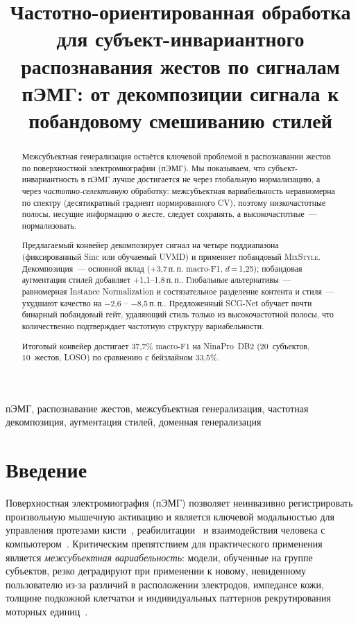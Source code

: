 \documentclass[conference]{IEEEtran}
\title{Частотно-ориентированная обработка для субъект-инвариантного распознавания жестов по сигналам пЭМГ: от декомпозиции сигнала к побандовому смешиванию стилей}
\author{
\IEEEauthorblockN{К.\,С.~Голован, И.\,А.~Зверева}
\IEEEauthorblockA{%
Департамент информационных технологий\\
Национальный исследовательский университет <<Высшая школа экономики>>\\
Москва, Россия\\
\texttt{kgolovan@edu.hse.ru}}
}
\newcommand{\pp}{\,п.\,п.}
\newcommand{\mixstyle}{\textsc{MixStyle}}
\newcommand{\uvmd}{\textsc{UVMD}}
\begin{document}
\maketitle

\begin{abstract}
Межсубъектная генерализация остаётся ключевой проблемой в распознавании жестов по поверхностной электромиографии (пЭМГ).
Мы показываем, что субъект-инвариантность в пЭМГ лучше достигается не через глобальную нормализацию, а через \emph{частотно-селективную} обработку: межсубъектная вариабельность неравномерна по спектру (десятикратный градиент нормированного CV), поэтому низкочастотные полосы, несущие информацию о жесте, следует сохранять, а высокочастотные~--- нормализовать.

Предлагаемый конвейер декомпозирует сигнал на четыре поддиапазона (фиксированный Sinc или обучаемый \uvmd{}) и применяет побандовый \mixstyle{}.
Декомпозиция~--- основной вклад (+3,7\pp{} macro-F1, $d$\,=\,1,25); побандовая аугментация стилей добавляет +1,1--1,8\pp{}.
Глобальные альтернативы~--- равномерная Instance Normalization и состязательное разделение контента и стиля~--- ухудшают качество на $-$2,6 -- $-$8,5\pp{}.
Предложенный SCG-Net обучает почти бинарный побандовый гейт, удаляющий стиль только из высокочастотной полосы, что количественно подтверждает частотную структуру вариабельности.

Итоговый конвейер достигает 37,7\% macro-F1 на NinaPro~DB2 (20~субъектов, 10~жестов, LOSO) по сравнению с бейзлайном 33,5\%.
\end{abstract}

\begin{IEEEkeywords}
пЭМГ, распознавание жестов, межсубъектная генерализация, частотная декомпозиция, аугментация стилей, доменная генерализация
\end{IEEEkeywords}

\section{Введение}
\label{sec:intro}

Поверхностная электромиография (пЭМГ) позволяет неинвазивно регистрировать произвольную мышечную активацию и является ключевой модальностью для управления протезами кисти~\cite{atzori2016deep}, реабилитации~\cite{farina2014extraction} и взаимодействия человека с компьютером~\cite{saponas2009enabling}.
Критическим препятствием для практического применения является \emph{межсубъектная вариабельность}: модели, обученные на группе субъектов, резко деградируют при применении к новому, невиденному пользователю из-за различий в расположении электродов, импедансе кожи, толщине подкожной клетчатки и индивидуальных паттернов рекрутирования моторных единиц~\cite{campbell2020current}.
\end{document}
